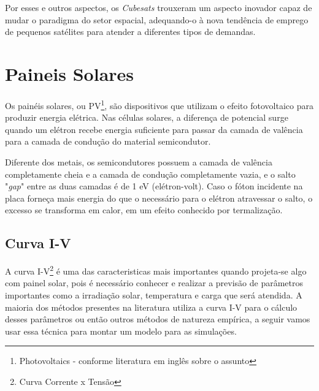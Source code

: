 \noindent
\begin{minipage}{\linewidth}
\label{cubesat1U_dimensions_fig}
\end{minipage}

Por esses e outros aspectos, os \textit{Cubesats} trouxeram um aspecto inovador capaz de mudar o paradigma do setor espacial, adequando-o à nova tendência de emprego de pequenos satélites para atender a diferentes tipos de demandas.

\section{Paineis Solares}
Os painéis solares, ou PV\footnote{Photovoltaics - conforme literatura em inglês sobre o assunto}, são dispositivos que utilizam o efeito fotovoltaico para produzir energia elétrica. Nas células solares, a diferença de potencial surge quando um elétron recebe energia suficiente para passar da camada de valência para a camada de condução do material semicondutor.

Diferente dos metais, os semicondutores possuem a camada de valência completamente cheia e a camada de condução completamente vazia, e o salto "\textit{gap}" entre as duas camadas é de 1 eV (elétron-volt). Caso o fóton incidente na placa forneça mais energia do que o necessário para o elétron atravessar o salto, o excesso se transforma em calor, em um efeito conhecido por termalização.

\subsection*{Curva I-V}
A curva I-V\footnote{Curva Corrente x Tensão} é uma das caracteristicas mais importantes quando projeta-se algo com painel solar, pois é necessário conhecer e realizar a previsão de parâmetros importantes como a irradiação solar, temperatura e carga que será atendida. A maioria dos métodos presentes na literatura utiliza a curva I-V para o cálculo desses parâmetros ou então outros métodos de natureza empírica, a seguir vamos usar essa técnica\cite{pv_datasheet} para montar um modelo para as simulações.

